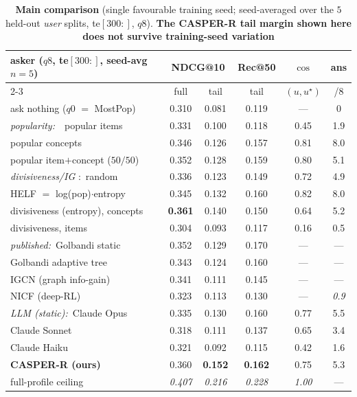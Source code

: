 \documentclass[11pt]{article}
\begin{document}
\begin{table}[h]\centering\small
\setlength{\tabcolsep}{4.5pt}
\begin{tabular}{l cc c c c}
\toprule
asker ($q8$, te$[300{:}]$, seed-avg $n{=}5$) & \multicolumn{2}{c}{NDCG@10} & Rec@50 & $\cos$ & ans\\
\cmidrule(lr){2-3}
 & full & tail & tail & $(u,u^\star)$ & /8\\
\midrule
ask nothing ($q0$ $=$ MostPop) & 0.310 & 0.081 & 0.119 & --- & 0\\
\midrule
\emph{popularity:}~~popular items & 0.331 & 0.100 & 0.118 & 0.45 & 1.9\\
\quad popular concepts & 0.346 & 0.126 & 0.157 & 0.81 & 8.0\\
\quad popular item$+$concept ($50/50$) & 0.352 & 0.128 & 0.159 & 0.80 & 5.1\\
\emph{divisiveness/IG} \cite{rashid,helf08}:~random & 0.336 & 0.123 & 0.149 & 0.72 & 4.9\\
\quad HELF $=$ log(pop)$\cdot$entropy & 0.345 & 0.132 & 0.160 & 0.82 & 8.0\\
\quad divisiveness (entropy), concepts & \textbf{0.361} & 0.140 & 0.150 & 0.64 & 5.2\\
\quad divisiveness, items & 0.304 & 0.093 & 0.117 & 0.16 & 0.5\\
\emph{published:}~Golbandi static \cite{golbandi11} & 0.352 & 0.129 & 0.170 & --- & ---\\
\quad Golbandi adaptive tree \cite{golbandi11} & 0.343 & 0.124 & 0.160 & --- & ---\\
\quad IGCN (graph info-gain) & 0.341 & 0.111 & 0.145 & --- & ---\\
\quad NICF (deep-RL) \cite{nicf} & 0.323 & 0.113 & 0.130 & --- & \emph{0.9}\\
\emph{LLM (static):}~Claude Opus & 0.335 & 0.130 & 0.160 & 0.77 & 5.5\\
\quad Claude Sonnet & 0.318 & 0.111 & 0.137 & 0.65 & 3.4\\
\quad Claude Haiku & 0.321 & 0.092 & 0.115 & 0.42 & 1.6\\
\midrule
\textbf{CASPER-R (ours)} & 0.360 & \textbf{0.152} & \textbf{0.162} & 0.75 & 5.3\\
full-profile ceiling & \emph{0.407} & \emph{0.216} & \emph{0.228} & \emph{1.00} & ---\\
\bottomrule
\end{tabular}
\caption{\textbf{Main comparison} (single favourable training seed; seed-averaged over the $5$ held-out \emph{user}
splits, te$[300{:}]$, $q8$). \textbf{The CASPER-R tail margin shown here does not survive training-seed variation}
}
\end{table}
\end{document}
